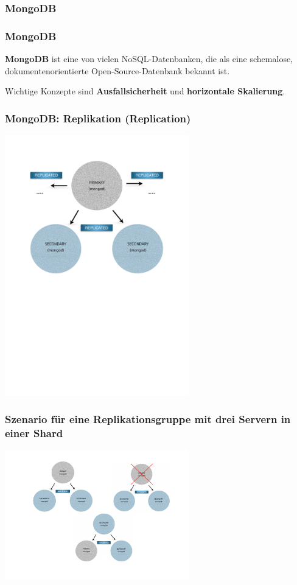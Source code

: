 \documentclass{beamer} %
\begin{document}
\subsubsection*{MongoDB}
\begin{frame}
\frametitle{MongoDB}
\textbf{MongoDB} ist eine von vielen NoSQL-Datenbanken, die als eine schemalose, dokumentenorientierte Open-Source-Datenbank bekannt ist. \newline

Wichtige Konzepte sind \textbf{Ausfallsicherheit} und \textbf{horizontale Skalierung}.
\end{frame}

\begin{frame}
\frametitle{MongoDB: Replikation (Replication)}

\begin{center}
\includegraphics[trim = 20mm 0mm 28mm 24mm, clip, width=0.6\textwidth]{img/replicaSet}
\end{center}
\end{frame}

\begin{frame}
\frametitle{Szenario für eine Replikationsgruppe mit drei Servern in einer Shard}
\begin{center}
\includegraphics[trim = 0mm 0mm 0mm 5mm, clip, width=0.6\textwidth]{img/szenario}
\end{center}


\end{frame}
\end{document}
